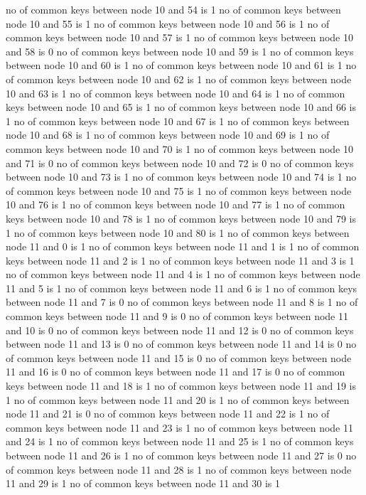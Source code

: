 no of common keys between node 10 and 54 is 1
no of common keys between node 10 and 55 is 1
no of common keys between node 10 and 56 is 1
no of common keys between node 10 and 57 is 1
no of common keys between node 10 and 58 is 0
no of common keys between node 10 and 59 is 1
no of common keys between node 10 and 60 is 1
no of common keys between node 10 and 61 is 1
no of common keys between node 10 and 62 is 1
no of common keys between node 10 and 63 is 1
no of common keys between node 10 and 64 is 1
no of common keys between node 10 and 65 is 1
no of common keys between node 10 and 66 is 1
no of common keys between node 10 and 67 is 1
no of common keys between node 10 and 68 is 1
no of common keys between node 10 and 69 is 1
no of common keys between node 10 and 70 is 1
no of common keys between node 10 and 71 is 0
no of common keys between node 10 and 72 is 0
no of common keys between node 10 and 73 is 1
no of common keys between node 10 and 74 is 1
no of common keys between node 10 and 75 is 1
no of common keys between node 10 and 76 is 1
no of common keys between node 10 and 77 is 1
no of common keys between node 10 and 78 is 1
no of common keys between node 10 and 79 is 1
no of common keys between node 10 and 80 is 1
no of common keys between node 11 and 0 is 1
no of common keys between node 11 and 1 is 1
no of common keys between node 11 and 2 is 1
no of common keys between node 11 and 3 is 1
no of common keys between node 11 and 4 is 1
no of common keys between node 11 and 5 is 1
no of common keys between node 11 and 6 is 1
no of common keys between node 11 and 7 is 0
no of common keys between node 11 and 8 is 1
no of common keys between node 11 and 9 is 0
no of common keys between node 11 and 10 is 0
no of common keys between node 11 and 12 is 0
no of common keys between node 11 and 13 is 0
no of common keys between node 11 and 14 is 0
no of common keys between node 11 and 15 is 0
no of common keys between node 11 and 16 is 0
no of common keys between node 11 and 17 is 0
no of common keys between node 11 and 18 is 1
no of common keys between node 11 and 19 is 1
no of common keys between node 11 and 20 is 1
no of common keys between node 11 and 21 is 0
no of common keys between node 11 and 22 is 1
no of common keys between node 11 and 23 is 1
no of common keys between node 11 and 24 is 1
no of common keys between node 11 and 25 is 1
no of common keys between node 11 and 26 is 1
no of common keys between node 11 and 27 is 0
no of common keys between node 11 and 28 is 1
no of common keys between node 11 and 29 is 1
no of common keys between node 11 and 30 is 1
